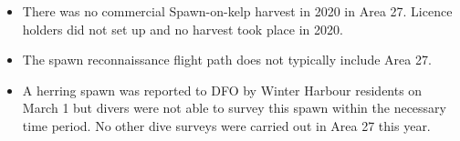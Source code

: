 \begin{itemize}

\item There was no commercial Spawn-on-kelp harvest in 2020 in Area 27.
Licence holders did not set up and no harvest took place in 2020.

\item The spawn reconnaissance flight path does not typically include Area 27.

\item A herring spawn was reported to DFO by Winter Harbour residents on March 1 but divers were not able to survey this spawn within the necessary time period.
No other dive surveys were carried out in Area 27 this year.

\end{itemize}
